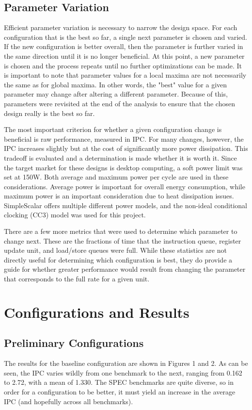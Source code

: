 \documentclass[english]{article}
\begin{document}
\subsection{Parameter Variation}
Efficient parameter variation is necessary to narrow the design space. For each configuration that is the best so far, a single next parameter is chosen and varied. If the new configuration is better overall, then the parameter is further varied in the same direction until it is no longer beneficial. At this point, a new parameter is chosen and the process repeats until no further optimizations can be made. It is important to note that parameter values for a local maxima are not necessarily the same as for global maxima. In other words, the "best" value for a given parameter may change after altering a different parameter. Because of this, parameters were revisited at the end of the analysis to ensure that the chosen design really is the best so far.

The most important criterion for whether a given configuration change is beneficial is raw performance, measured in IPC. For many changes, however, the IPC increases slightly but at the cost of significantly more power dissipation. This tradeoff is evaluated and a determination is made whether it is worth it. Since the target market for these designs is desktop computing, a soft power limit was set at 150W. Both average and maximum power per cycle are used in these considerations. Average power is important for overall energy consumption, while maximum power is an important consideration due to heat dissipation issues. SimpleScalar offers multiple different power models, and the non-ideal conditional clocking (CC3) model was used for this project.

There are a few more metrics that were used to determine which parameter to change next. These are the fractions of time that the instruction queue, register update unit, and load/store queues were full. While these statistics are not directly useful for determining which configuration is best, they do provide a guide for whether greater performance would result from changing the parameter that corresponds to the full rate for a given unit.

\section{Configurations and Results}
\subsection{Preliminary Configurations}
The results for the baseline configuration are shown in Figures 1 and 2. As can be seen, the IPC varies wildly from one benchmark to the next, ranging from 0.162 to 2.72, with a mean of 1.330. The SPEC benchmarks are quite diverse, so in order for a configuration to be better, it must yield an increase in the average IPC (and hopefully across all benchmarks).
\end{document}
